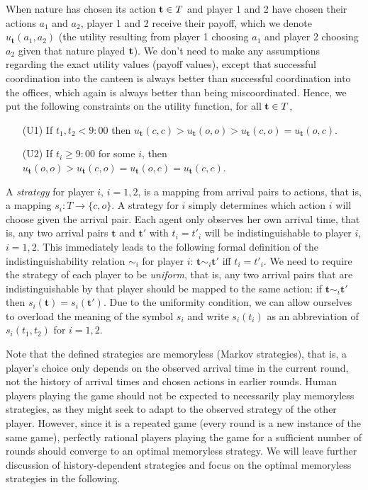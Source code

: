 \documentclass[twocolumn,a4paper,superscriptaddress,nofootinbib]{revtex4}
\begin{document}
When nature has chosen its action ${\bf t} \in T$ and player 1 and 2 have chosen their actions $a_1$ and $a_2$, player 1 and 2 receive their payoff, which we denote $u_\mathbf{t}(a_1,a_2)$ (the utility resulting from player 1 choosing $a_1$ and player 2 choosing $a_2$ given that nature played $\bf t$). We don't need to make any assumptions regarding the exact utility values (payoff values), except that successful coordination into the canteen is always better than successful coordination into the offices, which again is always better than being miscoordinated. Hence, we put the following constraints on the utility function, for all  ${\bf t} \in T$,
\begin{enumerate}
   \item[(U1)] If $t_1,t_2 < 9{:}00$ then $u_\mathbf{t}(c, c) > u_\mathbf{t}(o, o) > u_\mathbf{t}(c,o) = u_\mathbf{t}(o,c)$.
   \item[(U2)] If $t_i \geq 9{:}00$ for some $i$, then $u_\mathbf{t}(o,o) > u_\mathbf{t}(c,o) = u_\mathbf{t}(o,c) = u_\mathbf{t}(c,c)$.
\end{enumerate}

A \emph{strategy} for player $i$, $i =1,2$, is a mapping from arrival pairs to actions, that is, a mapping $s_i: T \to \{c,o\}$. A strategy for $i$ simply determines which action $i$ will choose given the arrival pair. Each agent only observes her own arrival time, that is, any two arrival pairs $\mathbf{t}$ and $\mathbf{t}'$ with $t_i = t'_i$ will be indistinguishable to player $i$, $i=1,2$. This immediately leads to the following formal definition of the indistinguishability relation $\sim_i$ for player $i$: $\mathbf{t} \sim_i \mathbf{t}'$ iff $t_i = t'_i$. We need to require the strategy of each player to be \emph{uniform}, that is, any two arrival pairs that are indistinguishable by that player should be mapped to the same action: if $\mathbf{t} \sim_i \mathbf{t'}$ then $s_i(\mathbf{t}) = s_i(\mathbf{t'})$. Due to the uniformity condition, we can allow ourselves to overload the meaning of the symbol $s_i$ and write $s_i(t_i)$ as an abbreviation of $s_i(t_1,t_2)$ for $i=1,2$.

Note that the defined strategies are memoryless (Markov strategies), that is, a player's choice only depends on the observed arrival time in the current round, not the history of arrival times and chosen actions in earlier rounds. Human players playing the game should not be expected to necessarily play memoryless strategies, as they might seek to adapt to the observed strategy of the other player. However, since it is a repeated game (every round is a new instance of the same game), perfectly rational players playing the game for a sufficient number of rounds should converge to an optimal memoryless strategy. We will leave further discussion of history-dependent strategies and focus on the optimal memoryless strategies in the following.
\end{document}
